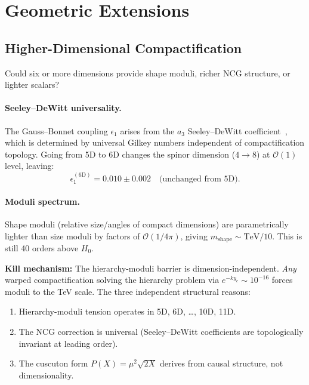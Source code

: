 \section{Geometric Extensions}
\label{sec:3-geometric}

\subsection{Higher-Dimensional Compactification}
\label{sec:3-higherdim}

Could six or more dimensions provide shape moduli, richer NCG structure, or lighter scalars?

\paragraph{Seeley--DeWitt universality.} The Gauss--Bonnet coupling $\epsilon_1$ arises from the $a_3$ Seeley--DeWitt coefficient~\cite{ch3:gilkey1975}, which is determined by universal Gilkey numbers independent of compactification topology. Going from 5D to 6D changes the spinor dimension ($4 \to 8$) at $\mathcal{O}(1)$ level, leaving:
\begin{equation}
  \epsilon_1^{(6\mathrm{D})} = 0.010 \pm 0.002 \quad\text{(unchanged from 5D)}.
  \label{eq:3-27}
\end{equation}

\paragraph{Moduli spectrum.} Shape moduli (relative size/angles of compact dimensions) are parametrically lighter than size moduli by factors of $\mathcal{O}(1/4\pi)$, giving $m_{\mathrm{shape}} \sim \mathrm{TeV}/10$. This is still 40 orders above $H_0$.

\textbf{Kill mechanism:} The hierarchy-moduli barrier is dimension-independent. \emph{Any} warped compactification solving the hierarchy problem via $e^{-ky_c} \sim 10^{-16}$ forces moduli to the TeV scale. The three independent structural reasons:

\begin{enumerate}
  \item Hierarchy-moduli tension operates in 5D, 6D, \ldots, 10D, 11D.
  \item The NCG correction is universal (Seeley--DeWitt coefficients are topologically invariant at leading order).
  \item The cuscuton form $P(X) = \mu^2\sqrt{2X}$ derives from causal structure, not dimensionality.
\end{enumerate}

